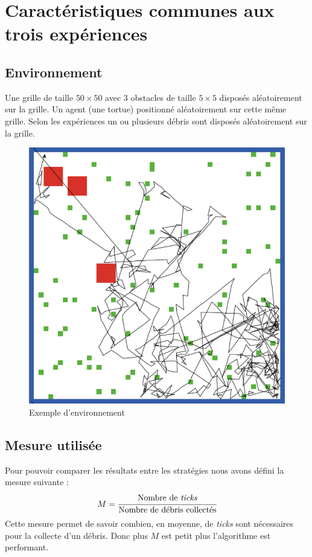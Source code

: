 \section{Caractéristiques communes aux trois expériences}
\subsection{Environnement}
Une grille de taille $50 \times 50$ avec 3 obstacles de taille $5 \times 5$
disposés aléatoirement sur la grille. Un agent (une tortue) positionné aléatoirement
sur cette même grille. Selon les expériences un ou plusieurs débris sont disposés 
aléatoirement sur la grille.
\begin{figure}[H]
	\begin{center}
		\includegraphics[scale=0.3]{diagrams/environnement.png}
		\caption{Exemple d'environnement}
		\label{fig:env}
	\end{center}
\end{figure}
\subsection{Mesure utilisée}
Pour pouvoir comparer les résultats entre les stratégies nous avons défini
la mesure suivante : $$M = \cfrac{\text{Nombre de \emph{ticks}}}{\text{Nombre de débris collectés}}$$
Cette mesure permet de savoir combien, en moyenne, de \emph{ticks} sont nécessaires
pour la collecte d'un débris. Donc plus $M$ est petit plus l'algorithme est performant.
